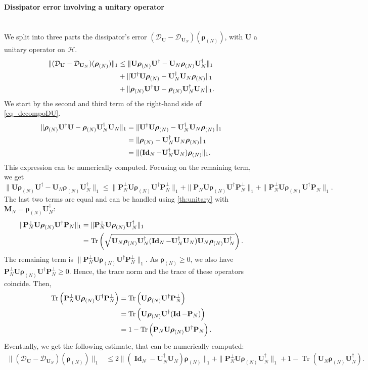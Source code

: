 \documentclass[a4paper,onecolumn,amsmath,amssymb,amsfonts,accepted=2026-03-06]{quantumarticle}
\newcommand{\Id}{\operatorname{\mathbf{Id}}}
\newcommand{\xH}{\mathcal{H}}
\newcommand{\xtr}[1]{\operatorname{Tr}\left(#1 \right)}
\newcommand{\cD}{\mathcal D}
\newcommand{\Proj}[1]{\mathbf{P}_{#1}}
\newcommand{\rN}{{\boldsymbol{\rho}_{(N)}}}
\newcommand{\Uop}{\mathbf{U}}
\begin{document}
\paragraph{Dissipator error involving a unitary operator}\mbox{}\\
We split into three parts the dissipator's error $(\cD_{\Uop}-\cD_{\Uop_N})(\rN)$, with $\Uop$ a unitary operator on $\xH$.
\begin{align}
    \label{eq_decompoDU}
    \notag
    \|(\cD_{\Uop}-\cD_{\Uop_N})(\rN)\|_1 &\leq \|\Uop \rN \Uop^\dag-\Uop_N \rN \Uop_N^\dag\|_1 \notag\\
    &+ \|\Uop^\dag \Uop \rN- \Uop_N^\dag \Uop_N \rN\|_1 \\
    &+ \|\rN \Uop^\dag \Uop-\rN  \Uop_N^\dag \Uop_N \|_1.
\end{align}
We start by the second and third term of the right-hand side of \cref{eq_decompoDU}.
\begin{align}
    \notag \|\rN \Uop^\dag \Uop-\rN  \Uop_N^\dag \Uop_N \|_1&=\|\Uop^\dag \Uop \rN- \Uop_N^\dag \Uop_N \rN\|_1\notag\\
    &=\|\rN- \Uop_N^\dag \Uop_N \rN\|_1\\
    &= \|(\Id_N-\Uop_N^\dag \Uop_N)\rN\|_1.
\end{align}
This expression can be numerically computed. Focusing on the remaining term, we get
\begin{equation}
    \|\Uop \rN \Uop^\dag - \Uop_N \rN \Uop_N^\dag\|_1 \leq \| \Proj{N}^\perp \Uop \rN \Uop^\dag \Proj{N}^\perp\|_1 + \| \Proj{N} \Uop \rN \Uop^\dag \Proj{N}^\perp\|_1 + \| \Proj{N}^\perp \Uop \rN \Uop^\dag \Proj{N}\|_1.
\end{equation}
The last two terms are equal and can be handled using \cref{th:unitary} with $\mathbf{M}_N=\rN \Uop_N^\dagger$:
\begin{align*}
    \notag \| \Proj{N}^\perp \Uop \rN \Uop^\dag \Proj{N}\|_1 &= \| \Proj{N}^\perp \Uop \rN \Uop^\dag_N\|_1\\
    &= \xtr{\sqrt{\Uop_N \rN \Uop_N^\dagger (\Id_N - \Uop_N^\dagger \Uop_N) \Uop_N \rN \Uop_N^\dagger}}.
\end{align*}
The remaining term is $\| \Proj{N}^\perp \Uop \rN \Uop^\dag \Proj{N}^\perp\|_1$. As $\rN \geq 0$, we also have $\Proj{N}^\perp \Uop \rN \Uop^\dag \Proj{N}^\perp \geq 0$. Hence, the trace norm and the trace of these operators coincide. Then,
\begin{align}
    \notag \xtr{\Proj{N}^\perp \Uop \rN \Uop^\dagger \Proj{N}^\perp}&=\xtr{\Uop \rN \Uop^\dag \Proj{N}^\perp}\\
    \notag &=\xtr{\Uop \rN \Uop^\dag (\Id-\Proj{N})}\\
    &= 1 - \xtr{\Proj{N} \Uop \rN \Uop^\dag \Proj{N}}.
\end{align}
Eventually, we get the following estimate, that can be numerically computed: 
\begin{align}
    \|(\cD_{\Uop}-\cD_{\Uop_N})(\rN)\|_1 &\leq 2\|(\Id_N-\Uop_N^\dag \Uop_N)\rN\|_1 + \| \Proj{N}^\perp \Uop \rN \Uop^\dag_N\|_1 + 1 - \xtr{ \Uop_N \rN \Uop_N^\dag }.
\end{align}
\end{document}
